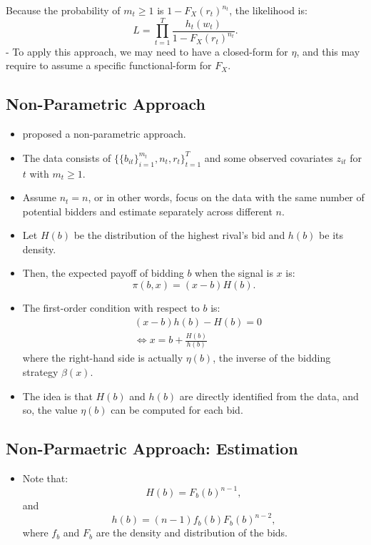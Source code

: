 \documentclass[
]{book}
\providecommand{\tightlist}{%
  \setlength{\itemsep}{0pt}\setlength{\parskip}{0pt}}
\begin{document}
Because the probability of \(m_t \ge 1\) is \(1 - F_X(r_t)^{n_t}\), the likelihood is:
\[
L = \prod_{t = 1}^T \frac{h_t(w_t)}{1 - F_X(r_t)^{n_t}}.
\]
- To apply this approach, we may need to have a closed-form for \(\eta\), and this may require to assume a specific functional-form for \(F_X\).

\hypertarget{non-parametric-approach}{%
\subsection{Non-Parametric Approach}\label{non-parametric-approach}}

\begin{itemize}
\tightlist
\item
  \citet{guerreOptimalNonparametricEstimation2000} proposed a non-parametric approach.
\item
  The data consists of \(\{\{b_{it}\}_{i = 1}^{m_t}, n_t, r_t\}_{t = 1}^T\) and some observed covariates \(z_{it}\) for \(t\) with \(m_t \ge 1\).
\item
  Assume \(n_t = n\), or in other words, focus on the data with the same number of potential bidders and estimate separately across different \(n\).
\item
  Let \(H(b)\) be the distribution of the highest rival's bid and \(h(b)\) be its density.
\item
  Then, the expected payoff of bidding \(b\) when the signal is \(x\) is:
  \[
  \pi(b, x) = (x - b) H(b).
  \]
\item
  The first-order condition with respect to \(b\) is:
  \[
  \begin{split}
  & (x - b) h(b) - H(b) = 0\\
  &\Leftrightarrow x = b + \frac{H(b)}{h(b)}
  \end{split}
  \]
  where the right-hand side is actually \(\eta(b)\), the inverse of the bidding strategy \(\beta(x)\).
\item
  The idea is that \(H(b)\) and \(h(b)\) are directly identified from the data, and so, the value \(\eta(b)\) can be computed for each bid.
\end{itemize}

\hypertarget{non-parmaetric-approach-estimation}{%
\subsection{Non-Parmaetric Approach: Estimation}\label{non-parmaetric-approach-estimation}}

\begin{itemize}
\tightlist
\item
  Note that:
  \[
  H(b) = F_b(b)^{n - 1},
  \]
  and
  \[
  h(b) = (n - 1) f_b(b) F_b(b)^{n - 2},
  \]
  where \(f_b\) and \(F_b\) are the density and distribution of the bids.
\end{itemize}
\end{document}
